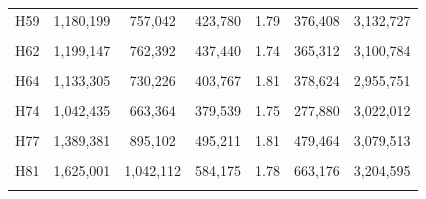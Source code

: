 \documentclass[
  a4paper,
  titlepage]{article}
\begin{document}
\begin{longtable}[t]{ccccccc}
H59 & 1,180,199 & 757,042 & 423,780 & 1.79 & 376,408 & 3,132,727\\
 
\cellcolor{gray!6}{H61} & \cellcolor{gray!6}{1,129,273} & \cellcolor{gray!6}{724,776} & \cellcolor{gray!6}{405,160} & \cellcolor{gray!6}{1.79} & \cellcolor{gray!6}{350,438} & \cellcolor{gray!6}{3,007,840}\\
 
H62 & 1,199,147 & 762,392 & 437,440 & 1.74 & 365,312 & 3,100,784\\
 
\cellcolor{gray!6}{H63} & \cellcolor{gray!6}{1,450,524} & \cellcolor{gray!6}{930,819} & \cellcolor{gray!6}{520,653} & \cellcolor{gray!6}{1.79} & \cellcolor{gray!6}{510,814} & \cellcolor{gray!6}{3,133,707}\\
 
H64 & 1,133,305 & 730,226 & 403,767 & 1.81 & 378,624 & 2,955,751\\
 
\cellcolor{gray!6}{H70} & \cellcolor{gray!6}{1,458,231} & \cellcolor{gray!6}{935,987} & \cellcolor{gray!6}{523,173} & \cellcolor{gray!6}{1.79} & \cellcolor{gray!6}{517,053} & \cellcolor{gray!6}{3,165,381}\\
 
H74 & 1,042,435 & 663,364 & 379,539 & 1.75 & 277,880 & 3,022,012\\
 
\cellcolor{gray!6}{H76} & \cellcolor{gray!6}{1,254,895} & \cellcolor{gray!6}{806,303} & \cellcolor{gray!6}{449,346} & \cellcolor{gray!6}{1.79} & \cellcolor{gray!6}{398,550} & \cellcolor{gray!6}{3,101,153}\\
 
H77 & 1,389,381 & 895,102 & 495,211 & 1.81 & 479,464 & 3,079,513\\
 
\cellcolor{gray!6}{H80} & \cellcolor{gray!6}{1,040,475} & \cellcolor{gray!6}{667,161} & \cellcolor{gray!6}{373,831} & \cellcolor{gray!6}{1.78} & \cellcolor{gray!6}{317,777} & \cellcolor{gray!6}{3,051,960}\\
 
H81 & 1,625,001 & 1,042,112 & 584,175 & 1.78 & 663,176 & 3,204,595\\
 
\cellcolor{gray!6}{H82} & \cellcolor{gray!6}{1,047,081} & \cellcolor{gray!6}{666,867} & \cellcolor{gray!6}{380,710} & \cellcolor{gray!6}{1.75} & \cellcolor{gray!6}{307,614} & \cellcolor{gray!6}{3,038,846}\\
 

\end{longtable}
\end{document}
